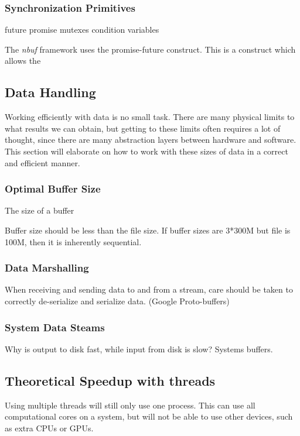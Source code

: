 \documentclass[a4paper]{article}
\newcommand{\nbuf}{\textit{nbuf} }
\begin{document}
\subsubsection{Synchronization Primitives}
future 
promise
mutexes
condition variables

The \nbuf framework uses the promise-future construct. This is a construct which allows the 


\newpage
\subsection{Data Handling}
Working efficiently with data is no small task. There are many physical limits to what results we can obtain, but getting
to these limits often requires a lot of thought, since there are many abstraction layers between hardware and software. This section
will elaborate on how to work with these sizes of data in a correct and efficient manner.


\subsubsection{Optimal Buffer Size}
The size of a buffer

Buffer size should be less than the file size. If buffer sizes are 3*300M but file is 100M,
then it is inherently sequential.



\subsubsection{Data Marshalling}
When receiving and sending data to and from a stream, care should be taken to correctly de-serialize and serialize data.
(Google Proto-buffers)


\subsubsection{System Data Steams}
Why is output to disk fast, while input from disk is slow? Systems buffers.



\subsection{Theoretical Speedup with threads}
Using multiple threads will still only use one process. This can use all computational cores on a system, but will not be able to use other devices, such as extra CPUs or GPUs.
\end{document}
